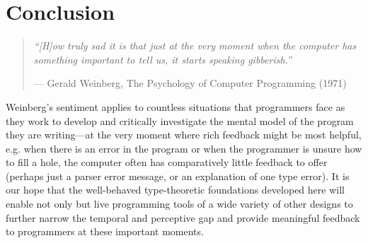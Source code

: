 \newcommand{\discussionSection}{Conclusion}
\section{\protect\discussionSection} %
\label{sec:discussion}

\begin{comment}
To conclude, we quote Weinberg from The Psychology of Computer Programming (1998): ``how truly sad it is that just at the very moment
when the computer has something important to tell us, it starts
speaking gibberish.''
\end{comment}
\vspace{3pt}
\begin{quote}
\textit{``[H]ow truly sad it is that just at the very moment
when the computer has something important to tell us, it starts
speaking gibberish.''}

\vspace{3pt}

\hfill{}--- Gerald Weinberg, The Psychology of Computer Programming (1971)
\end{quote}
\vspace{3pt}

\noindent
%
Weinberg's sentiment applies to countless situations that programmers face as they work to develop and critically investigate the mental model of the program they are writing---at the very moment where rich feedback might be most helpful, e.g. when there is an error in the program or when the programmer is unsure how to fill a hole, the computer often has comparatively little feedback to offer (perhaps just a parser error message, or an explanation of one type error). 
%
%
%
It is our hope that the well-behaved  type-theoretic foundations developed here will enable not only \Hazel but live programming tools of a wide variety of other designs to further narrow the temporal and perceptive gap and provide meaningful feedback to programmers at these important   moments. 


